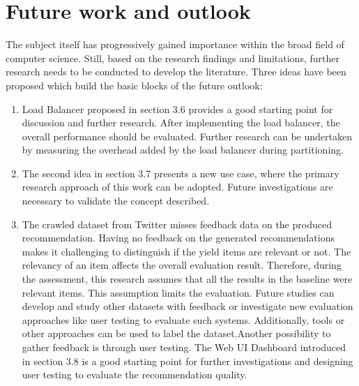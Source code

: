 \chapter{Future work and outlook}
\label{chap:future-work}
The subject itself has progressively gained importance within the broad field of computer science. Still, based on the research findings and limitations, further research needs to be conducted to develop the literature. Three ideas have been proposed which build the basic blocks of the future outlook:

\begin{enumerate}
    \item Load Balancer proposed in section 3.6 provides a good starting point for discussion and further research. After implementing the load balancer, the overall performance should be evaluated. Further research can be undertaken by measuring the overhead added by the load balancer during partitioning.
    \item The second idea in section 3.7 presents a new use case, where the primary research approach of this work can be adopted. Future investigations are necessary to validate the concept described.
    \item The crawled dataset from Twitter misses feedback data on the produced recommendation. Having no feedback on the generated recommendations makes it challenging to distinguish if the yield items are relevant or not. The relevancy of an item affects the overall evaluation result. Therefore, during the assessment, this research assumes that all the results in the baseline were relevant items. This assumption limits the evaluation. Future studies can develop and study other datasets with feedback or investigate new evaluation approaches like user testing to evaluate such systems. Additionally, tools or other approaches can be used to label the dataset.Another possibility to gather feedback is through user testing. The Web UI Dashboard introduced in section 3.8 is a good starting point for further investigations and designing user testing to evaluate the recommendation quality.
\end{enumerate}


